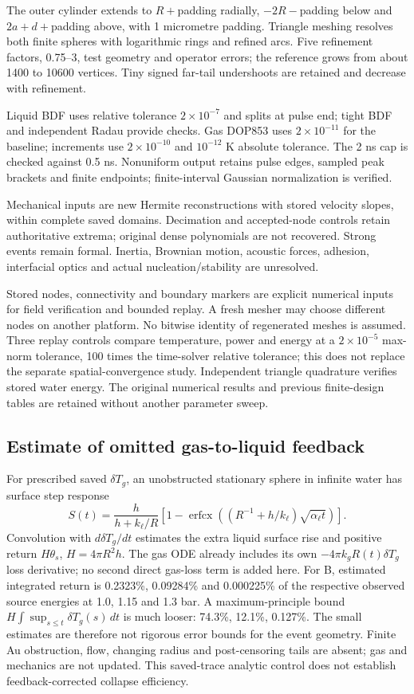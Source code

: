 \documentclass[10pt,a4paper]{article}
\begin{document}
The outer cylinder extends to $R+$padding radially, $-2R-$padding below and $2a+d+$padding above, with 1 micrometre padding. Triangle meshing \cite{triangle} resolves both finite spheres with logarithmic rings and refined arcs. Five refinement factors, 0.75--3, test geometry and operator errors; the reference grows from about 1400 to 10600 vertices. Tiny signed far-tail undershoots are retained and decrease with refinement.

Liquid BDF uses relative tolerance $2\times10^{-7}$ and splits at pulse end; tight BDF and independent Radau provide checks. Gas DOP853 uses $2\times10^{-11}$ for the baseline; increments use $2\times10^{-10}$ and $10^{-12}$ K absolute tolerance. The 2 ns cap is checked against 0.5 ns. Nonuniform output retains pulse edges, sampled peak brackets and finite endpoints; finite-interval Gaussian normalization is verified.

Mechanical inputs are new Hermite reconstructions with stored velocity slopes, within complete saved domains. Decimation and accepted-node controls retain authoritative extrema; original dense polynomials are not recovered. Strong events remain formal. Inertia, Brownian motion, acoustic forces, adhesion, interfacial optics and actual nucleation/stability are unresolved.

Stored nodes, connectivity and boundary markers are explicit numerical inputs for field verification and bounded replay. A fresh mesher may choose different nodes on another platform. No bitwise identity of regenerated meshes is assumed. Three replay controls compare temperature, power and energy at a $2\times10^{-5}$ max-norm tolerance, 100 times the time-solver relative tolerance; this does not replace the separate spatial-convergence study. Independent triangle quadrature verifies stored water energy. The original numerical results and previous finite-design tables are retained without another parameter sweep.

\subsection*{Estimate of omitted gas-to-liquid feedback}
For prescribed saved $\delta T_g$, an unobstructed stationary sphere in infinite water has surface step response
\[
 S(t)=\frac{h}{h+k_\ell/R}\left[1-\operatorname{erfcx}\!\left((R^{-1}+h/k_\ell)\sqrt{\alpha_\ell t}\right)\right].
\]
Convolution with $d\delta T_g/dt$ estimates the extra liquid surface rise and positive return $H\theta_s$, $H=4\pi R^2h$. The gas ODE already includes its own $-4\pi k_gR(t)\delta T_g$ loss derivative; no second direct gas-loss term is added here. For B, estimated integrated return is 0.2323\%, 0.09284\% and 0.000225\% of the respective observed source energies at 1.0, 1.15 and 1.3 bar. A maximum-principle bound $H\int\sup_{s\le t}\delta T_g(s)\,dt$ is much looser: 74.3\%, 12.1\%, 0.127\%. The small estimates are therefore not rigorous error bounds for the event geometry. Finite Au obstruction, flow, changing radius and post-censoring tails are absent; gas and mechanics are not updated. This saved-trace analytic control does not establish feedback-corrected collapse efficiency.
\end{document}
